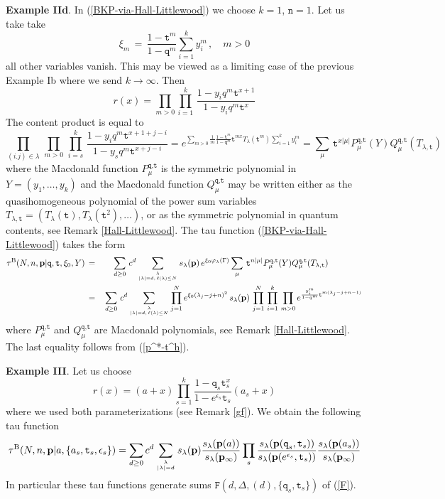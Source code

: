 \documentclass[a4paper,10pt]{article}
\newcommand{\bpow}{\mathbf{p}}
\theoremstyle{plain}
\theoremstyle{remark}
\def\be{\begin{equation}}
\def\ee{\end{equation}}
\def\bea{\begin{eqnarray}}
\def\eea{\end{eqnarray}}
\begin{document}
{\bf Example IId}. In (\ref{BKP-via-Hall-Littlewood}) we choose $k=1$, $\texttt{n}=1$. Let us take take
\[
 \xi_{ m}\,=\,\frac {1-\texttt{t}^m}{1-\texttt{q}^m}\sum_{i=1}^k y_i^m\,,
 \quad m>0
\]
all other variables vanish. This may be viewed as a limiting case
 of the previous Example Ib where we send $k\rightarrow\infty$.  Then
\[
r(x)= \prod_{m>0}\prod_{i=1}^k \,\frac{1-y_i q^m \texttt{t}^{x+1}}{1-y_i q^m \texttt{t}^{x}}
\]
The content product is equal to
\be
 \prod_{(i.j)\in\lambda}\,\prod_{m>0}\,\prod_{i=s}^k \,\frac{1-y_i q^m \texttt{t}^{x+1+j-i}}{1-y_s q^m \texttt{t}^{x+j-i}}=
e^{
\sum_{m > 0} \frac 1m \frac{1-\texttt{t}^{m}}{1-\texttt{q}^{m}} \texttt{t}^{mx} T_\lambda(\texttt{t}^m)\sum_{i=1}^k y_i^m}=
\sum_{\mu}\, \texttt{t}^{x|\mu|} P^{\texttt{q},\texttt{t}}_\mu(Y) Q^{\texttt{q},\texttt{t}}_\mu(T_{\lambda,\texttt{t}})
\ee
where the Macdonald function $P^{\texttt{q},\texttt{t}}_\mu$ is the symmetric polynomial in
$Y=(y_1,\dots,y_k)$ and the Macdonald function $Q^{\texttt{q},\texttt{t}}_\mu$ may be written either as the
quasihomogeneous polynomial of the
power sum variables $T_{\lambda,\texttt{t}}=(T_\lambda(\texttt{t}),T_\lambda(\texttt{t}^2),\dots)$, or as the symmetric
polynomial in quantum
contents,
see Remark \ref{Hall-Littlewood}.
The tau function (\ref{BKP-via-Hall-Littlewood}) takes the form
\bea\label{Macdonald}
\tau^{\rm B}(N,n,\bpow |\texttt{q},\texttt{t},\xi_0,Y) \,&=&\, \sum_{d\ge 0} \,c^d
\sum_{\lambda\atop |\lambda|=d,\, \ell(\lambda)\le N} s_\lambda(\bpow)
\,e^{\xi_0 \varphi_\lambda(\Gamma)}
\sum_{\mu}\, \texttt{t}^{n|\mu|} P^{\texttt{q},\texttt{t}}_\mu(Y)
Q^{\texttt{q},\texttt{t}}_\mu(T_{\lambda,\texttt{t}})\qquad\qquad
\\
&=&\,
\sum_{d\ge 0}\,c^d\sum_{\lambda\atop |\lambda|=d,\, \ell(\lambda)\le N}
\prod_{j=1}^N e^{\xi_0 (\lambda_j -j+n)^2}\,s_\lambda(\bpow)\,\prod_{j=1}^{N}\,\prod_{i=1}^k\,
\prod_{m>0} e^{\frac{y_i^m}{1-q^m}\texttt{t}^{m(\lambda_j-j+n-1)}}
  \label{s-s-s}
\eea
where $P^{\texttt{q},\texttt{t}}_\mu$ and $Q^{\texttt{q},\texttt{t}}_\mu$ are Macdonald polynomials, see
Remark \ref{Hall-Littlewood}. The last equality follows from (\ref{p^*-t^h}).

{\bf Example III}. Let us choose
\[
 r(x)=(a+x)\prod_{s=1}^k \frac{1-\texttt{q}_s\texttt{t}_s^x}{1-e^{\epsilon_s}\texttt{t}_s}(a_s+x)
\]
where we used both parameterizations (see Remark \ref{gf}).
We obtain the following tau function
\be\label{tau-F}
 \tau^{\rm B}(N,n,\bpow |a,\{a_s,\texttt{t}_s,\epsilon_s  \} ) =\sum_{d\ge 0}c^d\sum_{\lambda\atop |\lambda|=d } s_\lambda(\bpow)
 \frac{s_\lambda(\bpow(a))}{s_\lambda(\bpow_\infty)}\prod_{s}
 \frac{s_\lambda(\bpow(\texttt{q}_s,\texttt{t}_s))}{s_\lambda(\bpow(e^{\epsilon_s},\texttt{t}_s))}
 \frac{s_\lambda(\bpow(a_s))}{s_\lambda(\bpow_\infty)}
\ee
In particular these tau functions generate sums $\texttt{F}(d,\Delta,(d),\{\texttt{q}_s,\texttt{t}_s\})$ of (\ref{F}).
\end{document}
